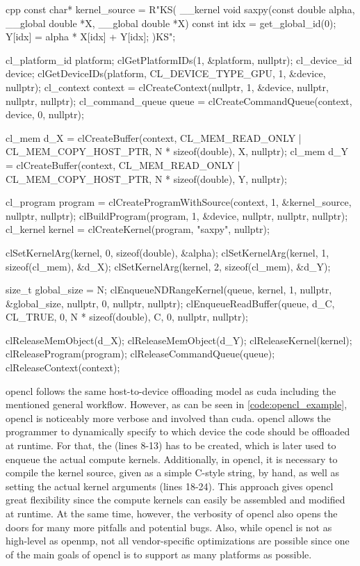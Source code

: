 \begin{listing}
    \begin{moderncode}[fontsize=\small]{cpp}
const char* kernel_source = R"KS(
__kernel void saxpy(const double alpha, __global double *X, __global double *X) {
    const int idx = get_global_id(0);
    Y[idx] = alpha * X[idx] + Y[idx];
}
)KS";

cl_platform_id platform;
clGetPlatformIDs(1, &platform, nullptr);
cl_device_id device;
clGetDeviceIDs(platform, CL_DEVICE_TYPE_GPU, 1, &device, nullptr);
cl_context context = clCreateContext(nullptr, 1, &device, nullptr, nullptr, nullptr);
cl_command_queue queue = clCreateCommandQueue(context, device, 0, nullptr);

cl_mem d_X = clCreateBuffer(context, CL_MEM_READ_ONLY | CL_MEM_COPY_HOST_PTR, N * sizeof(double), X, nullptr);
cl_mem d_Y = clCreateBuffer(context, CL_MEM_READ_ONLY | CL_MEM_COPY_HOST_PTR, N * sizeof(double), Y, nullptr);

cl_program program = clCreateProgramWithSource(context, 1, &kernel_source, nullptr, nullptr);
clBuildProgram(program, 1, &device, nullptr, nullptr, nullptr);
cl_kernel kernel = clCreateKernel(program, "saxpy", nullptr);

clSetKernelArg(kernel, 0, sizeof(double), &alpha);
clSetKernelArg(kernel, 1, sizeof(cl_mem), &d_X);
clSetKernelArg(kernel, 2, sizeof(cl_mem), &d_Y);

size_t global_size = N;
clEnqueueNDRangeKernel(queue, kernel, 1, nullptr, &global_size, nullptr, 0, nullptr, nullptr);
clEnqueueReadBuffer(queue, d_C, CL_TRUE, 0, N * sizeof(double), C, 0, nullptr, nullptr);

clReleaseMemObject(d_X); 
clReleaseMemObject(d_Y);
clReleaseKernel(kernel); 
clReleaseProgram(program);
clReleaseCommandQueue(queue); 
clReleaseContext(context);
    \end{moderncode}
    \caption{%
    A simple DAXPY example using \gls{opencl} including all necessary compilation, memory, and kernel launch operations. }
    \label{code:opencl_example}
\end{listing}

\gls{opencl} follows the same host-to-device offloading model as \gls{cuda} including the mentioned general workflow. 
However, as can be seen in \autoref{code:opencl_example}, \gls{opencl} is noticeably more verbose and involved than \gls{cuda}. 
\gls{opencl} allows the programmer to dynamically specify to which device the code should be offloaded at runtime. 
For that, the  (lines 8-13) has to be created, which is later used to enqueue the actual compute kernels. 
Additionally, in \gls{opencl}, it is necessary to compile the kernel source, given as a simple C-style string, by hand, as well as setting the actual kernel arguments (lines 18-24). 
This approach gives \gls{opencl} great flexibility since the compute kernels can easily be assembled and modified at runtime. 
At the same time, however, the verbosity of \gls{opencl} also opens the doors for many more pitfalls and potential bugs. 
Also, while \gls{opencl} is not as high-level as \gls{openmp}, not all vendor-specific optimizations are possible since one of the main goals of \gls{opencl} is to support as many platforms as possible. 

